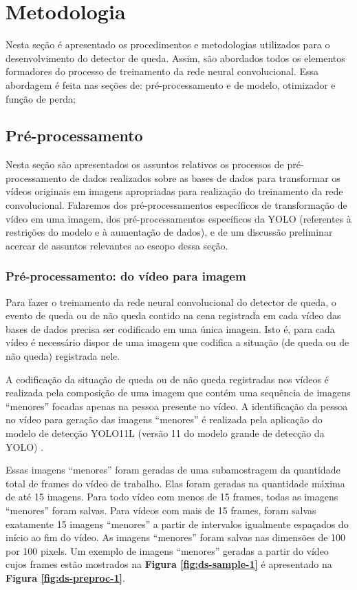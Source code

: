 \documentclass[12pt]{article}
\begin{document}
\section{Metodologia}\label{sec:meto}
Nesta seção é apresentado os procedimentos e metodologias utilizados para o desenvolvimento do detector de queda. Assim, são abordados todos os elementos formadores do processo de treinamento da rede neural convolucional. Essa abordagem é feita nas seções de: pré-processamento e de modelo, otimizador e função de perda;

%
%
\subsection{Pré-processamento}\label{subsec:pre-proc}
Nesta seção são apresentados os assuntos relativos os processos de pré-processamento de dados realizados sobre as bases de dados para transformar os vídeos originais em imagens apropriadas para realização do treinamento da rede convolucional. Falaremos dos pré-processamentos específicos de transformação de vídeo em uma imagem, dos pré-processamentos específicos da YOLO (referentes à restrições do modelo e à aumentação de dados), e de um discussão preliminar acercar de assuntos relevantes ao escopo dessa seção.
%
%
\subsubsection{Pré-processamento: do vídeo para imagem}\label{subsubsec:pre-proc-1}
Para fazer o treinamento da rede neural convolucional do detector de queda, o evento de queda ou de não queda contido na cena registrada em cada vídeo das bases de dados \citep{payutch2025, Alam2024GMDCSA24, charfi2013fall} precisa ser codificado em uma única imagem. Isto é, para cada vídeo é necessário dispor de uma imagem que codifica a situação (de queda ou de não queda) registrada nele. 

A codificação da situação de queda ou de não queda registradas nos vídeos é realizada pela composição de uma imagem que contém uma sequência de imagens “menores” focadas apenas na pessoa presente no vídeo. A identificação da pessoa no vídeo para geração das imagens “menores” é realizada pela aplicação do modelo de detecção YOLO11L (versão 11 do modelo grande de detecção da YOLO) \citep{ultralytics2025}. 

Essas imagens “menores” foram geradas de uma subamostragem da quantidade total de frames do vídeo de trabalho. Elas foram geradas na quantidade máxima de até 15 imagens. Para todo vídeo com menos de 15 frames, todas as imagens “menores” foram salvas. Para vídeos com mais de 15 frames, foram salvas exatamente 15 imagens “menores” a partir de intervalos igualmente espaçados do início ao fim do vídeo. As imagens “menores” foram salvas nas dimensões de 100 por 100 pixels. Um exemplo de imagens “menores” geradas a partir do vídeo cujos frames estão mostrados na \textbf{Figura \ref{fig:ds-sample-1}} é apresentado na \textbf{Figura \ref{fig:ds-preproc-1}}.
\end{document}
